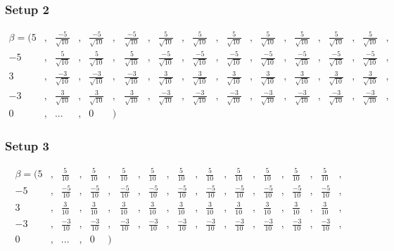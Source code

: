 \subsubsection{Setup 2}
\begin{equation} \label{eq:setup2} 
\begin{aligned}
\beta = (	5&,& \frac{-5}{\sqrt{10}}&,&  \frac{-5}{\sqrt{10}}&,&  \frac{-5}{\sqrt{10}}&,&  \frac{5}{\sqrt{10}}&,&  \frac{5}{\sqrt{10}}&,&  \frac{5}{\sqrt{10}}&,&  \frac{5}{\sqrt{10}}&,&  \frac{5}{\sqrt{10}}&,&  \frac{5}{\sqrt{10}}&,&  \frac{5}{\sqrt{10}}&,& \\
-5&,& \frac{5}{\sqrt{10}}&,&  \frac{5}{\sqrt{10}}&,&  \frac{5}{\sqrt{10}}&,&  \frac{-5}{\sqrt{10}}&,&  \frac{-5}{\sqrt{10}}&,&  \frac{-5}{\sqrt{10}}&,&  \frac{-5}{\sqrt{10}}&,&  \frac{-5}{\sqrt{10}}&,&  \frac{-5}{\sqrt{10}}&,&  \frac{-5}{\sqrt{10}}&,& \\
3&,& \frac{-3}{\sqrt{10}}&,&  \frac{-3}{\sqrt{10}}&,&  \frac{-3}{\sqrt{10}}&,&  \frac{3}{\sqrt{10}}&,&  \frac{3}{\sqrt{10}}&,&  \frac{3}{\sqrt{10}}&,&  \frac{3}{\sqrt{10}}&,&  \frac{3}{\sqrt{10}}&,&  \frac{3}{\sqrt{10}}&,&  \frac{3}{\sqrt{10}}&,& \\
-3&,& \frac{3}{\sqrt{10}}&,&  \frac{3}{\sqrt{10}}&,&  \frac{3}{\sqrt{10}}&,&  \frac{-3}{\sqrt{10}}&,&  \frac{-3}{\sqrt{10}}&,&  \frac{-3}{\sqrt{10}}&,&  \frac{-3}{\sqrt{10}}&,&  \frac{-3}{\sqrt{10}}&,&  \frac{-3}{\sqrt{10}}&,&  \frac{-3}{\sqrt{10}}&,& \\
0&,& ...&,& 0&)&
\end{aligned}
\end{equation}

\subsubsection{Setup 3}
\begin{equation} \label{eq:setup3} 
\begin{aligned}
\beta = (	5&,& \frac{5}{10}&,&  \frac{5}{10}&,&  \frac{5}{10}&,&  \frac{5}{10}&,&  \frac{5}{10}&,&  \frac{5}{10}&,&  \frac{5}{10}&,&  \frac{5}{10}&,&  \frac{5}{10}&,&  \frac{5}{10}&,& \\
-5&,& \frac{-5}{10}&,&  \frac{-5}{10}&,&  \frac{-5}{10}&,&  \frac{-5}{10}&,&  \frac{-5}{10}&,&  \frac{-5}{10}&,&  \frac{-5}{10}&,&  \frac{-5}{10}&,&  \frac{-5}{10}&,&  \frac{-5}{10}&,& \\
3&,& \frac{3}{10}&,&  \frac{3}{10}&,&  \frac{3}{10}&,&  \frac{3}{10}&,&  \frac{3}{10}&,&  \frac{3}{10}&,&  \frac{3}{10}&,&  \frac{3}{10}&,&  \frac{3}{10}&,&  \frac{3}{10}&,& \\
-3&,& \frac{-3}{10}&,&  \frac{-3}{10}&,&  \frac{-3}{10}&,&  \frac{-3}{10}&,&  \frac{-3}{10}&,&  \frac{-3}{10}&,&  \frac{-3}{10}&,&  \frac{-3}{10}&,&  \frac{-3}{10}&,&  \frac{-3}{10}&,& \\
0&,& ...&,& 0&)&
\end{aligned}
\end{equation}

